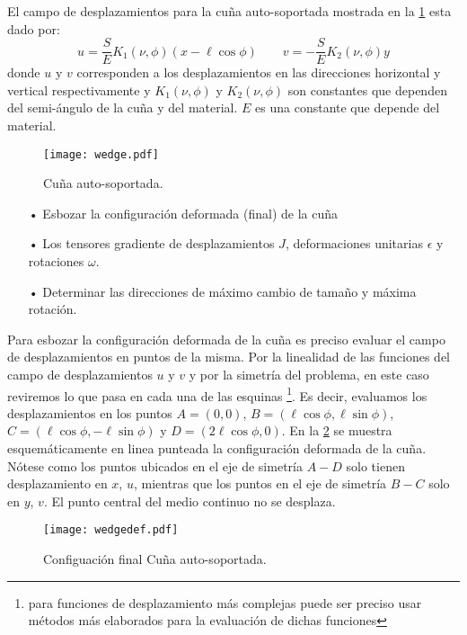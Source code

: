 \documentclass[../notas medios.tex]{subfiles}
\begin{document}
El campo de desplazamientos para la cuña auto-soportada mostrada en la \cref{wedge} esta dado por:
\begin{equation*}	
	u = \frac{S}{E} K_1 (\nu ,\phi) (x - \ell \cos\phi)\qquad
	v =  - \frac{S}{E} K_2 (\nu ,\phi) y
\end{equation*}
donde $u$ y $v$ corresponden a los desplazamientos en las direcciones horizontal y vertical respectivamente y ${K_1}\left( {\nu ,\phi } \right)$ y ${K_2}\left( {\nu ,\phi } \right)$ son constantes que dependen del semi-ángulo de la cuña y del material. $E$ es una constante que depende del material. 
\begin{figure}[H]
\centering
	\texttt{[image: wedge.pdf]}
	\caption{Cuña auto-soportada.}
	\label{wedge}
\end{figure}

\begin{itemize}
\item[•] Esbozar la configuración deformada (final) de la cuña
\item[•] Los tensores gradiente de desplazamientos $J$, deformaciones unitarias $\epsilon$ y rotaciones $\omega$.
\item[•] Determinar las direcciones de máximo cambio de tamaño y máxima rotación.
\end{itemize}

Para esbozar la configuración deformada de la cuña es preciso evaluar el campo de desplazamientos en puntos de la misma. Por la linealidad de las funciones del campo de desplazamientos $u$ y $v$ y por la simetría del problema, en este caso reviremos lo que pasa en cada una de las esquinas \footnote{para funciones de desplazamiento más complejas puede ser preciso usar métodos más elaborados para la evaluación de dichas funciones}. Es decir, evaluamos los desplazamientos en los puntos $A = (0,0)$,  $B = (\ell \cos\phi, \ell \sin\phi)$, $C = (\ell \cos\phi, -\ell \sin\phi)$ y $D = (2\ell \cos\phi,0)$. En la \cref{wedgedef} se muestra esquemáticamente en linea punteada la configuración deformada de la cuña. Nótese  como los puntos ubicados en el eje de simetría $A-D$ solo tienen desplazamiento en $x$, $u$, mientras que los puntos en el eje de simetría $B-C$ solo en $y$, $v$. El punto central del medio continuo no se desplaza. 
\begin{figure}[H]
\centering
	\texttt{[image: wedgedef.pdf]}
	\caption{Configuación final Cuña auto-soportada.}
	\label{wedgedef}
\end{figure}
\end{document}
